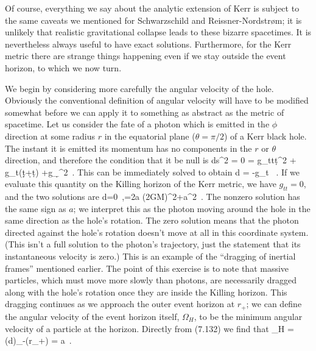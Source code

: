 \documentclass[12pt]{article}
\begin{document}
Of course, everything we say about the analytic extension of Kerr
is subject to the same caveats we mentioned for Schwarzschild and
Reissner-Nordstr{\o}m; it is unlikely that realistic gravitational
collapse leads to these bizarre spacetimes.  It is nevertheless always
useful to have exact solutions.  Furthermore, for the Kerr metric
there are strange things happening even if we stay outside the
event horizon, to which we now turn.

We begin by considering more carefully the angular velocity of the
hole.  Obviously the conventional definition of angular velocity
will have to be modified somewhat before we can apply it to something
as abstract as the metric of spacetime.  Let us consider the fate
of a photon which is emitted in the $\phi$ direction at some
radius $r$ in the equatorial plane ($\theta=\pi/2$) of a Kerr black
hole.  The instant it is emitted its momentum has no components in
the $r$ or $\theta$ direction, and therefore the condition that it
be null is
\be
  ds^2 = 0 = g_{tt}\d t^2 + g_{t\phi}(\d t\d\phi+\d\phi \d t)
  +g_{\phi\phi}\d\phi^2\ .\label{7.131}
\ee
This can be immediately solved to obtain
\be
  {{d\phi}} = -{{g_{t\phi}}}
  \pm{}\ .\label{7.132}
\ee
If we evaluate this quantity on the Killing horizon of the Kerr
metric, we have $g_{tt}=0$, and the two solutions are
\be
  {{d\phi}}=0\ ,={{2a}\over
  {(2GM)^2+a^2}}\ .\label{7.133}
\ee
The nonzero solution has the same sign as $a$; we interpret this
as the photon moving around the hole in the same direction as the
hole's rotation.  The zero solution means that the photon directed
against the hole's rotation doesn't move at all in this coordinate
system.  (This isn't a full solution to the photon's trajectory, just
the statement that its instantaneous velocity is zero.)  This is 
an example of the ``dragging of inertial frames'' mentioned earlier.  
The point of this exercise is to note that
massive particles, which must move more slowly than photons, are
necessarily dragged along with the hole's rotation once they are 
inside the Killing horizon.  This dragging continues as we approach
the outer event horizon at $r_+$; we can define the angular velocity
of the event horizon itself, $\Omega_H$, to be the minimum angular
velocity of a particle at the horizon.  Directly from (7.132) we
find that
\be
  \Omega_H = \left({{d\phi}}\right)_-(r_+)
  = {a}\ .\label{7.134}
\ee
\end{document}
